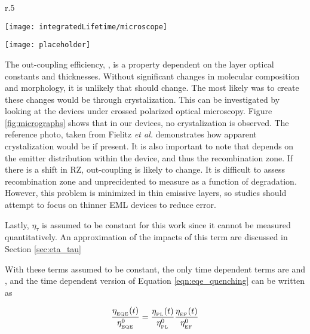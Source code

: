 \documentclass[../thesis.tex]{subfiles}
\begin{document}
\begin{wrapfigure}{r}{.5\textwidth}
    \begin{minipage}{\linewidth}
    \centering%
    \texttt{[image: integratedLifetime/microscope]}

    \texttt{[image: placeholder]}
\end{minipage}
\caption{Cross polarized optical micrographs of (a) active device area (b) crystalized film from Fielitz \textit{et al.}.\cite{Fielitz2016}}\label{fig:micrographs}
\end{wrapfigure}

The out-coupling efficiency, \oc, is a property dependent on the layer optical constants and thicknesses.
Without significant changes in molecular composition and morphology, it is unlikely that \oc should change.
The most likely was to create these changes would be through crystalization.  
This can be investigated by looking at the devices under crossed polarized optical microscopy.\cite{Fielitz2016}
Figure \ref{fig:micrographs} shows that in our devices, no crystalization is observed.
The reference photo, taken from Fielitz \textit{et al.}\cite{Fielitz2016} demonstrates how apparent crystalization would be if present.
It is also important to note that \oc depends on the emitter distribution within the device, and thus the recombination zone.
If there is a shift in RZ, out-coupling is likely to change.  
It is difficult to assess recombination zone and unprecidented to measure as a function of degradation.
However, this problem is minimized in thin emissive layers, so studies should attempt to focus on thinner EML devices to reduce error.

Lastly, $\eta_\tau$ is assumed to be constant for this work since it cannot be measured quantitatively.
An approximation of the impacts of this term are discussed in Section \ref{sec:eta_tau}

With these terms assumed to be constant, the only time dependent terms are \pl and \ef, and the time dependent version of Equation \ref{eqn:eqe_quenching} can be written as


\begin{equation}
\frac{\eta_{_\text{\tiny EQE}}(t)}{\eta_{_\text{\tiny EQE}}^0}=\frac{\eta_{_\text{\tiny PL}}(t)}{\eta_{_\text{\tiny PL}}^0}\frac{\eta_{_\text{\tiny EF}}(t)}{\eta_{_\text{\tiny EF}}^0}
\label{eqn_eqe_decay_components}
\end{equation}
\end{document}
